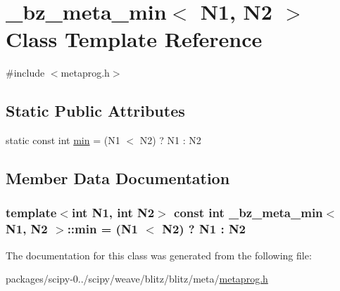 \hypertarget{class__bz__meta__min}{}\section{\+\_\+bz\+\_\+meta\+\_\+min$<$ N1, N2 $>$ Class Template Reference}
\label{class__bz__meta__min}


{\ttfamily \#include $<$metaprog.\+h$>$}

\subsection*{Static Public Attributes}
\begin{DoxyCompactItemize}
\item 
static const int \hyperlink{class__bz__meta__min_ac5519bfd8de1e06e971ae635ab615f13}{min} = (N1 $<$ N2) ? N1 \+: N2
\end{DoxyCompactItemize}


\subsection{Member Data Documentation}
\hypertarget{class__bz__meta__min_ac5519bfd8de1e06e971ae635ab615f13}{}
\subsubsection[{min}]{\setlength{\rightskip}{0pt plus 5cm}template$<$int N1, int N2$>$ const int {\bf \+\_\+bz\+\_\+meta\+\_\+min}$<$ N1, N2 $>$\+::min = (N1 $<$ N2) ? N1 \+: N2\hspace{0.3cm}{\ttfamily [static]}}\label{class__bz__meta__min_ac5519bfd8de1e06e971ae635ab615f13}


The documentation for this class was generated from the following file\+:\begin{DoxyCompactItemize}
\item 
packages/scipy-\/0../scipy/weave/blitz/blitz/meta/\hyperlink{metaprog_8h}{metaprog.\+h}\end{DoxyCompactItemize}
